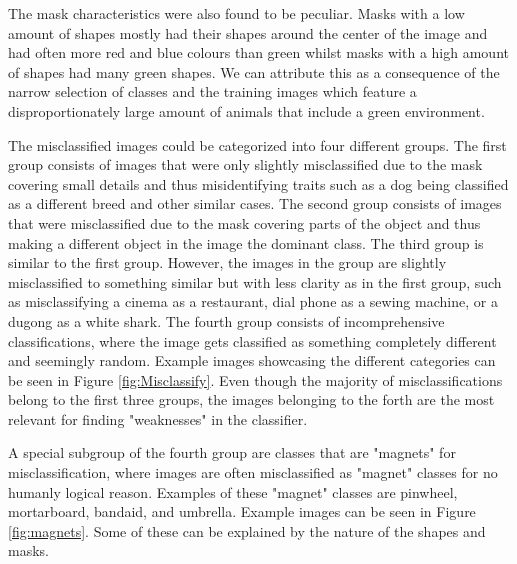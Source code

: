 \documentclass[conference]{IEEEtran}
\begin{document}
The mask characteristics were also found to be peculiar.
Masks with a low amount of shapes mostly had their shapes around the center of the image and had often more red and blue colours than green whilst masks with a high amount of shapes had many green shapes.
We can attribute this as a consequence of the narrow selection of classes and the training images which feature a disproportionately large amount of animals that include a green environment.

The misclassified images could be categorized into four different groups.
The first group consists of images that were only slightly misclassified due to the mask covering small details and thus misidentifying traits such as a dog being classified as a different breed and other similar cases.
The second group consists of images that were misclassified due to the mask covering parts of the object and thus making a different object in the image the dominant class.
The third group is similar to the first group. 
However, the images in the group are slightly misclassified to something similar but with less clarity as in the first group, such as misclassifying a cinema as a restaurant, dial phone as a sewing machine, or a dugong as a white shark.
The fourth group consists of incomprehensive classifications, where the image gets classified as something completely different and seemingly random.
Example images showcasing the different categories can be seen in Figure \ref{fig:Misclassify}.
Even though the majority of misclassifications belong to the first three groups, the images belonging to the forth are the most relevant for finding "weaknesses" in the classifier.

A special subgroup of the fourth group are classes that are "magnets" for misclassification, where images are often misclassified as "magnet" classes for no humanly logical reason.
Examples of these "magnet" classes are pinwheel, mortarboard, bandaid, and umbrella.
Example images can be seen in Figure \ref{fig:magnets}.
Some of these can be explained by the nature of the shapes and masks.
\end{document}
